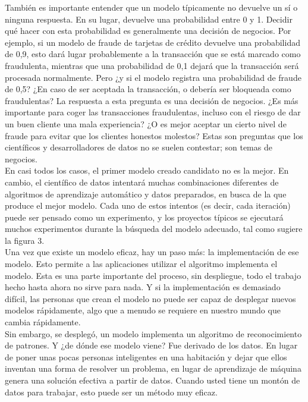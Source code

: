\documentclass[11pt]{article}
\begin{document}
También es importante entender que un modelo típicamente no devuelve un sí o ninguna respuesta. En su lugar, devuelve una probabilidad entre 0 y 1. Decidir qué hacer con esta probabilidad es generalmente una decisión de negocios. Por ejemplo, si un modelo de fraude de tarjetas de crédito devuelve una probabilidad de 0,9, esto dará lugar probablemente a la transacción que se está marcado como fraudulenta, mientras que una probabilidad de 0,1 dejará que la transacción será procesada normalmente. Pero ¿y si el modelo registra una probabilidad de fraude de 0,5? ¿En caso de ser aceptada la transacción, o debería ser bloqueada como fraudulentas? La respuesta a esta pregunta es una decisión de negocios. ¿Es más importante para coger las transacciones fraudulentas, incluso con el riesgo de dar un buen cliente una mala experiencia? ¿O es mejor aceptar un cierto nivel de fraude para evitar que los clientes honestos molestos? Estas son preguntas que los científicos y desarrolladores de datos no se suelen contestar; son temas de negocios.\\

En casi todos los casos, el primer modelo creado candidato no es la mejor. En cambio, el científico de datos intentará muchas combinaciones diferentes de algoritmos de aprendizaje automático y datos preparados, en busca de la que produce el mejor modelo. Cada uno de estos intentos (es decir, cada iteración) puede ser pensado como un experimento, y los proyectos típicos se ejecutará muchos experimentos durante la búsqueda del modelo adecuado, tal como sugiere la figura 3.\\

Una vez que existe un modelo eficaz, hay un paso más: la implementación de ese modelo. Esto permite a las aplicaciones utilizar el algoritmo implementa el modelo. Esta es una parte importante del proceso, sin despliegue, todo el trabajo hecho hasta ahora no sirve para nada. Y si la implementación es demasiado difícil, las personas que crean el modelo no puede ser capaz de desplegar nuevos modelos rápidamente, algo que a menudo se requiere en nuestro mundo que cambia rápidamente.\\

Sin embargo, se desplegó, un modelo implementa un algoritmo de reconocimiento de patrones. Y ¿de dónde ese modelo viene? Fue derivado de los datos. En lugar de poner unas pocas personas inteligentes en una habitación y dejar que ellos inventan una forma de resolver un problema, en lugar de aprendizaje de máquina genera una solución efectiva a partir de datos. Cuando usted tiene un montón de datos para trabajar, esto puede ser un método muy eficaz.\\
\end{document}
